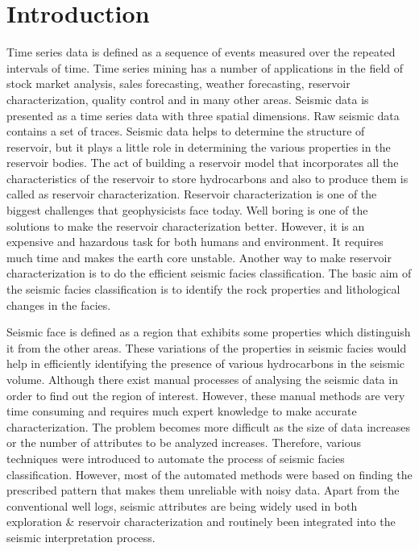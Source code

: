\documentclass[a4paper]{article}
\begin{document}
\section{Introduction}
Time series data\cite{1} is defined as a sequence of events measured over the repeated intervals of time. Time series mining has a number of applications in the field of stock market analysis\cite{2}, sales forecasting\cite{3}, weather forecasting\cite{3}, reservoir characterization\cite{4}, quality control\cite{4} and in many other areas. Seismic data is presented as a time series data with three spatial dimensions. Raw seismic data contains a set of traces. Seismic data\cite{bookseismic} helps to determine the structure of reservoir, but it plays a little role in determining the various properties in the reservoir bodies.
The act of building a reservoir model that incorporates all the characteristics of the reservoir to store hydrocarbons and also to produce them is called as reservoir characterization\cite{bookseismic,6}. Reservoir characterization is one of the biggest challenges that geophysicists face today. Well boring is one of the solutions to make the reservoir characterization better. However, it is an expensive and hazardous task for both humans and environment. It requires much time and makes the earth core unstable. Another way to make reservoir characterization is to do the efficient seismic facies classification\cite{6}. The basic aim of the seismic facies classification is to identify the rock properties and lithological changes in the facies\cite{bookseismic}.

Seismic face\cite{bookseismic} is defined as a region that exhibits some properties which distinguish it from the other areas. These variations of the properties in seismic facies would help in efficiently identifying the presence of various hydrocarbons in the seismic volume. Although there exist manual processes of analysing the seismic data in order to find out the region of interest. However, these manual methods are very time consuming and requires much expert knowledge to make accurate characterization\cite{bookseismic}. The problem becomes more difficult as the size of data increases or the number of attributes to be analyzed increases. Therefore, various techniques were introduced to automate the process of seismic facies classification. However, most of the automated methods were based on finding the prescribed pattern that makes them unreliable with noisy data. Apart from the conventional well logs, seismic attributes are being widely used in both exploration \& reservoir characterization and routinely been integrated into the seismic interpretation process. 
\end{document}
